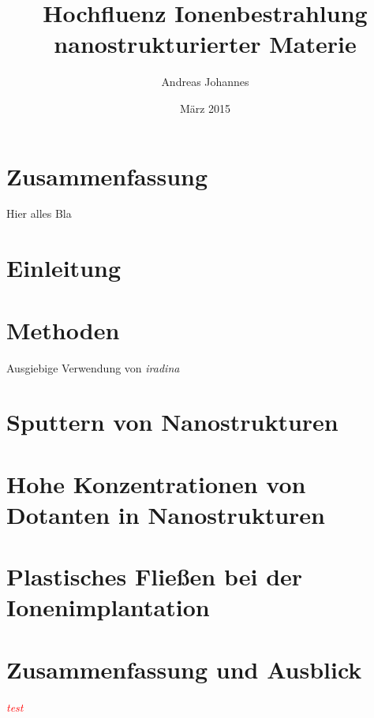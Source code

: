 \documentclass[11pt,
paper=a4,				
DIV=calc,		  %
headinclude,
]{scrbook}
\newcommand{\TODO}[1]{{\LARGE{\textcolor{red}{\emph {#1 }}}}}
\begin{document}
\titlehead{Friedrich Schiller Universität Jena\\
PAF}
\subject{Dissertation}
\title{Hochfluenz Ionenbestrahlung nanostrukturierter Materie}
\author{Andreas Johannes}
\date{März 2015}
\maketitle



\chapter*{Zusammenfassung}

Hier alles Bla


\tableofcontents

\chapter{Einleitung}

\chapter{Methoden}

Ausgiebige Verwendung von \emph{iradina} \cite{borschel_ion_2011}

\chapter{Sputtern von Nanostrukturen}

\chapter{Hohe Konzentrationen von Dotanten in Nanostrukturen}

\chapter{Plastisches Fließen bei der Ionenimplantation}

\chapter{Zusammenfassung und Ausblick}


\TODO{test}



\end{document}
